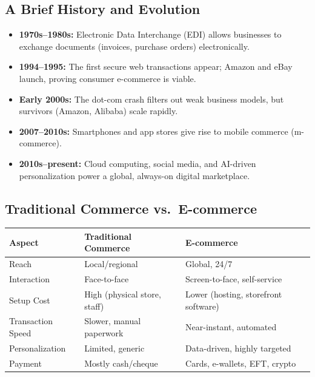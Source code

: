 \documentclass[11pt,a4paper]{article}
\begin{document}
\subsection{A Brief History and Evolution}
\begin{itemize}[leftmargin=*]
  \item \textbf{1970s--1980s:} Electronic Data Interchange (EDI) allows businesses to exchange documents (invoices, purchase orders) electronically.
  \item \textbf{1994--1995:} The first secure web transactions appear; Amazon and eBay launch, proving consumer e-commerce is viable.
  \item \textbf{Early 2000s:} The dot-com crash filters out weak business models, but survivors (Amazon, Alibaba) scale rapidly.
  \item \textbf{2007--2010s:} Smartphones and app stores give rise to mobile commerce (m-commerce).
  \item \textbf{2010s--present:} Cloud computing, social media, and AI-driven personalization power a global, always-on digital marketplace.
\end{itemize}

\subsection{Traditional Commerce vs.\ E-commerce}
\begin{center}
\begin{tabular}{@{}p{3.0cm}p{5.4cm}p{5.4cm}@{}}
\toprule
\rowcolor{primary!15}
\textbf{Aspect} & \textbf{Traditional Commerce} & \textbf{E-commerce} \\
\midrule
Reach & Local/regional & Global, 24/7 \\
Interaction & Face-to-face & Screen-to-face, self-service \\
Setup Cost & High (physical store, staff) & Lower (hosting, storefront software) \\
Transaction Speed & Slower, manual paperwork & Near-instant, automated \\
Personalization & Limited, generic & Data-driven, highly targeted \\
Payment & Mostly cash/cheque & Cards, e-wallets, EFT, crypto \\
\bottomrule
\end{tabular}
\end{center}

\end{document}
